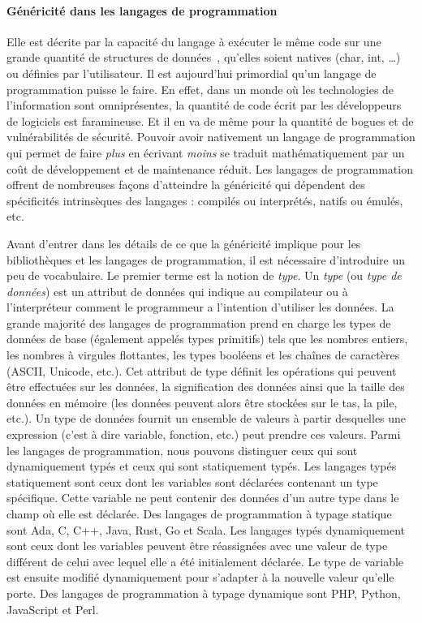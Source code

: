 \paragraph{Généricité dans les langages de programmation} Elle est décrite par la capacité du langage à exécuter le même
code sur une grande quantité de structures de données~\parencite{dehnert.1998.fundamentals}, qu'elles soient natives
(char, int, \ldots) ou définies par l'utilisateur. Il est aujourd'hui primordial qu'un langage de programmation puisse
le faire. En effet, dans un monde où les technologies de l'information sont omniprésentes, la quantité de code écrit par
les développeurs de logiciels est faramineuse. Et il en va de même pour la quantité de bogues et de vulnérabilités de
sécurité. Pouvoir avoir nativement un langage de programmation qui permet de faire \emph{plus} en écrivant \emph{moins}
se traduit mathématiquement par un coût de développement et de maintenance réduit. Les langages de programmation offrent
de nombreuses façons d'atteindre la généricité qui dépendent des spécificités intrinsèques des langages : compilés ou
interprétés, natifs ou émulés, etc.

Avant d'entrer dans les détails de ce que la généricité implique pour les bibliothèques et les langages de
programmation, il est nécessaire d'introduire un peu de vocabulaire. Le premier terme est la notion de \emph{type}. Un
\emph{type} (ou \emph{type de données}) est un attribut de données qui indique au compilateur ou à l'interpréteur
comment le programmeur a l'intention d'utiliser les données. La grande majorité des langages de programmation prend en
charge les types de données de base (également appelés types primitifs) tels que les nombres entiers, les nombres à
virgules flottantes, les types booléens et les chaînes de caractères (ASCII, Unicode, etc.). Cet attribut de type
définit les opérations qui peuvent être effectuées sur les données, la signification des données ainsi que la taille des
données en mémoire (les données peuvent alors être stockées sur le tas, la pile, etc.). Un type de données fournit un
ensemble de valeurs à partir desquelles une expression (c'est à dire variable, fonction, etc.) peut prendre ces valeurs.
Parmi les langages de programmation, nous pouvons distinguer ceux qui sont dynamiquement typés et ceux qui sont
statiquement typés. Les langages typés statiquement sont ceux dont les variables sont déclarées contenant un type
spécifique. Cette variable ne peut contenir des données d'un autre type dans le champ où elle est déclarée. Des langages
de programmation à typage statique sont Ada, C, C++, Java, Rust, Go et Scala. Les langages typés dynamiquement sont ceux
dont les variables peuvent être réassignées avec une valeur de type différent de celui avec lequel elle a été
initialement déclarée. Le type de variable est ensuite modifié dynamiquement pour s'adapter à la nouvelle valeur qu'elle
porte. Des langages de programmation à typage dynamique sont PHP, Python, JavaScript et Perl.

